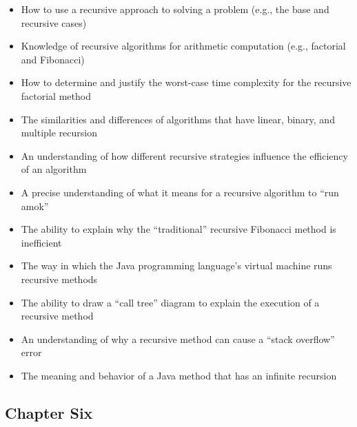 \documentclass[11pt]{article}
\begin{document}
\begin{itemize}

  \setlength{\itemsep}{0.05in}

  \item How to use a recursive approach to solving a problem (e.g., the base
    and recursive cases)
  \item Knowledge of recursive algorithms for arithmetic computation (e.g., factorial
    and Fibonacci)
  \item How to determine and justify the worst-case time complexity for
    the recursive factorial method
  \item The similarities and differences of algorithms that have linear, binary, and multiple
    recursion
  \item An understanding of how different recursive strategies influence the
    efficiency of an algorithm
  \item A precise understanding of what it means for a recursive algorithm to
    ``run amok''
  \item The ability to explain why the ``traditional'' recursive Fibonacci
    method is inefficient
  \item The way in which the Java programming language's virtual machine runs recursive methods
  \item The ability to draw a ``call tree'' diagram to explain the
    execution of a recursive method
  \item An understanding of why a recursive method can cause a ``stack
    overflow'' error
  \item The meaning and behavior of a Java method that has an infinite recursion

\end{itemize}

\vspace*{-.2in}
\subsection*{Chapter Six}
\end{document}
